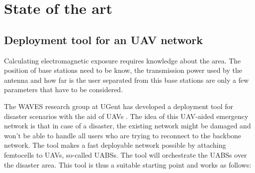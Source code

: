 \chapter{State of the art}
\label{chap:stateoftheart}

\section{Deployment tool for an UAV network}
\label{sec:stateoftheart:deploymenttool}

Calculating electromagnetic exposure requires knowledge about the area. The position of base stations need to be know,
 the transmission power used by the antenna and how far is the user separated from this base stations are only a few parameters
 that have to be considered.

The WAVES research group at UGent has developed a deployment tool for disaster scenarios with the aid of UAVs \cite{J2}.
The idea of this  UAV-aided emergency network is that in case of a disaster, the existing network might be damaged and won't be able 
to handle all users who are trying to reconnect to the backbone network. 
The tool makes a fast deployable network possible by attaching femtocells to UAVs, so-called \gls{UABS}s.
The tool will orchestrate the \gls{UABS}s over the disaster area. This tool is thus a suitable starting point and works as follows:



